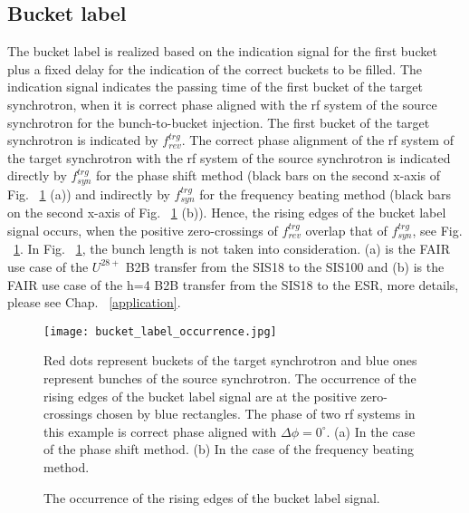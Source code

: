 \subsection{Bucket label}
\label{sec:bucket_label}
The bucket label is realized based on the indication signal for the first bucket plus a fixed delay for the indication of the correct buckets to be filled. The indication signal indicates the passing time of the first bucket of the target synchrotron, when it is correct phase aligned with the rf system of the source synchrotron for the bunch-to-bucket injection. The first bucket of the target synchrotron is indicated by $f_{\mathit{rev}}^{trg}$. The correct phase alignment of the rf system of the target synchrotron with the rf system of the source synchrotron is indicated directly by $f_{\mathit{syn}}^{trg}$ for the phase shift method (black bars on the second x-axis of Fig. ~\ref{bucket_label_occurrence} (a)) and indirectly by $f_{\mathit{syn}}^{trg}$ for the frequency beating method (black bars on the second x-axis of Fig. ~\ref{bucket_label_occurrence} (b)). Hence, the rising edges of the bucket label signal occurs, when the positive zero-crossings of $f_{\mathit{rev}}^{trg}$ overlap that of $f_{\mathit{syn}}^{trg}$, see Fig. ~\ref{bucket_label_occurrence}. In Fig. ~\ref{bucket_label_occurrence}, the bunch length is not taken into consideration. (a) is the FAIR use case of the $U^{28+}$ B2B transfer from the SIS18 to the SIS100 and (b) is the FAIR use case of the h=4 B2B transfer from the SIS18 to the ESR, more details, please see Chap. ~\ref{application}.
\begin{figure}[!htb]
   \centering   
   \texttt{[image: bucket\_label\_occurrence.jpg]}
   \caption{The occurrence of the rising edges of the bucket label signal.}{Red dots represent buckets of the target synchrotron and blue ones represent bunches of the source synchrotron. The occurrence of the rising edges of the bucket label signal are at the positive zero-crossings chosen by blue rectangles. The phase of two rf systems in this example is correct phase aligned with $\Delta\phi=0^\circ$. (a) In the case of the phase shift method. (b) In the case of the frequency beating method.}
   \label{bucket_label_occurrence}
\end{figure}

